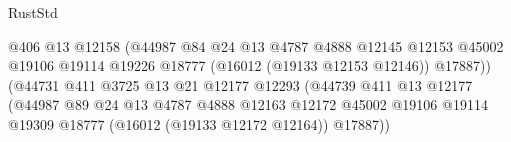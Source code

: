 \begin{lexlean}{RustStd}
\begin{coremodule}
                                                  @406
                                                  @13
                                                  @12158
                                                  (@44987
                                                    @84
                                                    @24
                                                    @13
                                                    @4787
                                                    @4888
                                                    @12145
                                                    @12153
                                                    @45002
                                                    @19106
                                                    @19114
                                                    @19226
                                                    @18777
                                                    (@16012 (@19133 @12153 @12146))
                                                    @17887))
                                                (@44731
                                                  @411
                                                  @3725
                                                  @13
                                                  @21
                                                  @12177
                                                  @12293
                                                  (@44739
                                                    @411
                                                    @13
                                                    @12177
                                                    (@44987
                                                      @89
                                                      @24
                                                      @13
                                                      @4787
                                                      @4888
                                                      @12163
                                                      @12172
                                                      @45002
                                                      @19106
                                                      @19114
                                                      @19309
                                                      @18777
                                                      (@16012 (@19133 @12172 @12164))
                                                      @17887))

\end{coremodule}
\end{lexlean}
